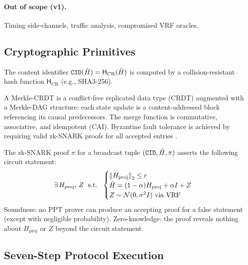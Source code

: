 \paragraph{Out of scope (v1).}
Timing side-channels, traffic analysis, compromised VRF oracles.

\subsection{Cryptographic Primitives}

\begin{definition}
  The content identifier $\mathtt{CID}(\tilde{H}) = \mathsf{H}_{\mathrm{CR}}(\tilde{H})$ is
  computed by a collision-resistant hash function $\mathsf{H}_{\mathrm{CR}}$ (e.g., SHA3-256).
\end{definition}

\begin{definition}
  A Merkle-CRDT is a conflict-free replicated data type (CRDT) \cite{shapiro2011crdt}
  augmented with a Merkle-DAG structure: each state update is a content-addressed block
  referencing its causal predecessors.  The merge function is commutative, associative,
  and idempotent (CAI).  Byzantine fault tolerance is achieved by requiring valid
  zk-SNARK proofs for all accepted entries \cite{kleppmann2022crdt}.
\end{definition}

\begin{definition}
  \label{def:zksnark_circuit}
  The zk-SNARK proof $\pi$ for a broadcast tuple $(\mathtt{CID}, \tilde{H}, \pi)$ asserts
  the following circuit statement:
  \[
    \exists\, H_{\mathrm{proj}},\, Z \;\text{ s.t. }\;
    \begin{cases}
      \left\|H_{\mathrm{proj}}\right\|_2 \leq r \\
      \tilde{H} = (1-\alpha)H_{\mathrm{proj}} + \alpha I + Z \\
      Z \sim \mathcal{N}(0, \sigma^2 I) \text{ via VRF}
    \end{cases}
  \]
  Soundness: no PPT prover can produce an accepting proof for a false statement
  (except with negligible probability).
  Zero-knowledge: the proof reveals nothing about $H_{\mathrm{proj}}$ or $Z$ beyond
  the circuit statement.
\end{definition}

\subsection{Seven-Step Protocol Execution}

